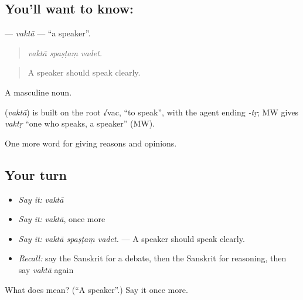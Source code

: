 \subsection*{You'll want to know: }
\textbf{} — \emph{vaktā} — \textquotedblleft{}a speaker\textquotedblright{}.

\begin{quote}
  
\end{quote}

\begin{quote}
\emph{vaktā spaṣṭaṃ vadet.}
\end{quote}

\begin{quote}
A speaker should speak clearly.
\end{quote}

A masculine noun.

\begin{cousinweb}
\textbf{} (\emph{vaktā}) is built on the root √vac, \textquotedblleft{}to speak\textquotedblright{}, with the agent ending \emph{-tṛ}; MW gives \emph{vaktṛ} \textquotedblleft{}one who speaks, a speaker\textquotedblright{} (MW).
\end{cousinweb}

\begin{grammarlens}[title={What you've built}]
One more word for giving reasons and opinions.
\end{grammarlens}

\subsection*{Your turn}
\begin{itemize}
\raggedright
  \item \emph{Say it:} \emph{vaktā}
  \item \emph{Say it:} \emph{vaktā}, once more
  \item \emph{Say it:} \emph{vaktā spaṣṭaṃ vadet.} — A speaker should speak clearly.
  \item \emph{Recall:} say the Sanskrit for a debate, then the Sanskrit for reasoning, then say \emph{vaktā} again
\end{itemize}

\begin{tcolorbox}[breakable,colback=teal!4,colframe=teal!35!black,title={Before you move on}]
What does  mean? (\textquotedblleft{}A speaker\textquotedblright{}.) Say it once more.
\end{tcolorbox}
